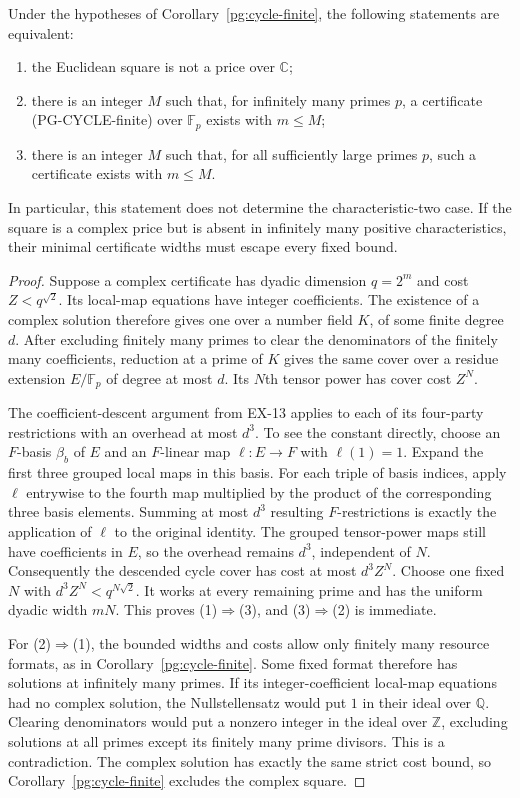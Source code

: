 \begin{corollary}
\label{pg:cycle-specialization}
Under the hypotheses of Corollary~\ref{pg:cycle-finite}, the
following statements are equivalent:
\begin{enumerate}
\item the Euclidean square is not a price over $\mathbb C$;
\item there is an integer $M$ such that, for infinitely many primes
$p$, a certificate (PG-CYCLE-finite) over $\mathbb F_p$ exists with
$m\leq M$;
\item there is an integer $M$ such that, for all sufficiently large
primes $p$, such a certificate exists with $m\leq M$.
\end{enumerate}
In particular, this statement does not determine the characteristic-two
case. If the square is a complex price but is absent in infinitely
many positive characteristics, their minimal certificate widths
must escape every fixed bound.
\end{corollary}
\begin{proof}
Suppose a complex certificate has dyadic dimension $q=2^m$ and
cost $Z<q^{\sqrt2}$. Its local-map equations have integer
coefficients. The existence of a complex solution therefore gives
one over a number field $K$, of some finite degree $d$. After
excluding finitely many primes to clear the denominators of the
finitely many coefficients, reduction at a prime of $K$ gives the
same cover over a residue extension $E/\mathbb F_p$ of degree
at most $d$. Its $N$th tensor power has cover cost $Z^N$.

The coefficient-descent argument from EX-13 applies to each of
its four-party restrictions with an overhead at most $d^3$.
To see the constant directly, choose an $F$-basis $\beta_b$ of
$E$ and an $F$-linear map $\ell:E\to F$ with $\ell(1)=1$.
Expand the first three grouped local maps in this basis. For each
triple of basis indices, apply $\ell$ entrywise to the fourth map
multiplied by the product of the corresponding three basis
elements. Summing at most $d^3$ resulting $F$-restrictions is
exactly the application of $\ell$ to the original identity.
The grouped tensor-power maps still have coefficients in $E$,
so the overhead remains $d^3$, independent of $N$.
Consequently the descended cycle cover has cost at most
$d^3Z^N$. Choose one fixed $N$ with
$d^3Z^N<q^{N\sqrt2}$. It works at every remaining prime and
has the uniform dyadic width $mN$. This proves (1)$\Rightarrow$(3),
and (3)$\Rightarrow$(2) is immediate.

For (2)$\Rightarrow$(1), the bounded widths and costs allow only
finitely many resource formats, as in
Corollary~\ref{pg:cycle-finite}. Some fixed format therefore has
solutions at infinitely many primes. If its integer-coefficient
local-map equations had no complex solution, the
Nullstellensatz would put $1$ in their ideal over $\mathbb Q$.
Clearing denominators would put a nonzero integer in the ideal
over $\mathbb Z$, excluding solutions at all primes except its
finitely many prime divisors. This is a contradiction. The
complex solution has exactly the same strict cost bound, so
Corollary~\ref{pg:cycle-finite} excludes the complex square.
\end{proof}

